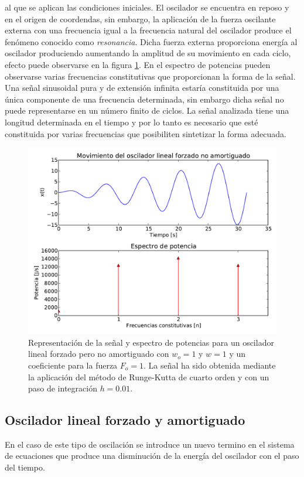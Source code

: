 \documentclass[11pt]{article}
\begin{document}
al que se aplican las condiciones iniciales. El oscilador se encuentra en reposo y en el origen de coordendas, sin embargo, la aplicación de la fuerza oscilante externa con una frecuencia igual a la frecuencia natural del oscilador produce el fenómeno conocido como \textit{resonancia}. Dicha fuerza externa proporciona energía al oscilador produciendo aumentando la amplitud de su movimiento en cada ciclo, efecto puede observarse en la figura \ref{fig:caso_forzado}. En el espectro de potencias pueden observarse varias frecuencias constitutivas que proporcionan la forma de la señal. Una señal sinusoidal pura y de extensión infinita estaría constituida por una única componente de una frecuencia determinada, sin embargo dicha señal no puede representarse en un número finito de ciclos. La señal analizada tiene una longitud determinada en el tiempo y por lo tanto es necesario que esté constituida por varias frecuencias que posibiliten sintetizar la forma adecuada.

\begin{figure}
\centering
\includegraphics[width=0.75\linewidth]{caso_forzado.pdf}
\caption{Representación de la señal y espectro de potencias para un oscilador lineal forzado pero no amortiguado con $w_o = 1$ y $w = 1$ y un coeficiente para la fuerza $F_o = 1$. La señal ha sido obtenida mediante la aplicación del método de Runge-Kutta de cuarto orden y con un paso de integración $h = 0.01$.}
\label{fig:caso_forzado}
\end{figure}

\subsection{Oscilador lineal forzado y amortiguado}
En el caso de este tipo de oscilación se introduce un nuevo termino en el sistema de ecuaciones que produce una disminución de la energía del oscilador con el paso del tiempo.
\end{document}
